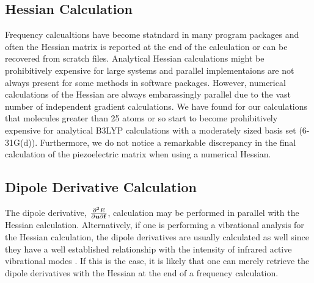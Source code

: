 \subsection{Hessian Calculation}

Frequency calcualtions have become statndard in many program packages and often the Hessian matrix is reported at the 
end of the calculation or can be recovered from scratch files.  
Analytical Hessian calculations
might be prohibitively expensive for large systems and parallel implementaions are not always present for some methods in software packages.
However, numerical calculations of the Hessian are always 
embarassingly parallel due to the vast number of independent gradient calculations.  
We have found for our calculations that molecules greater than 25 atoms or so start to become
prohibitively expensive for analytical B3LYP \cite{b3lyp,Lee1988} calculations with a moderately
sized basis set (6-31G(d))\cite{pople}.
Furthermore, we do not notice a remarkable discrepancy in the 
final calculation of the piezoelectric matrix when using a numerical Hessian.  

\subsection{Dipole Derivative Calculation}

The dipole derivative, $\frac{\partial^2 E}{\partial {\ensuremath{\bf{u}}} \partial {\ensuremath{\bf{f}}}}$, calculation may be performed in parallel with the Hessian calculation.
Alternatively, if one is performing a vibrational analysis for the Hessian calculation, the 
dipole derivatives are usually calculated as well since they have a well established 
relationship with the intensity of infrared active vibrational modes \cite{kom}.  
If this is the case, it is likely that one can merely retrieve the dipole derivatives with the Hessian 
at the end of a frequency calculation. 

